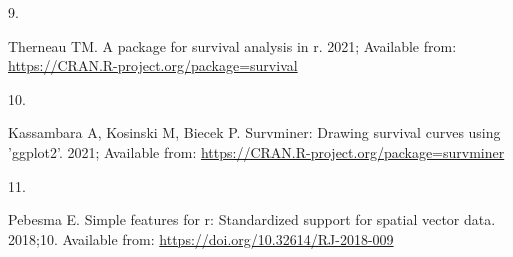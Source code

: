 \documentclass[
]{article}
\newlength{\cslhangindent}
\newlength{\csllabelwidth}
\newlength{\cslentryspacingunit} %
\newenvironment{CSLReferences}[2] %
 {%
  \setlength{\parindent}{0pt}
  \ifodd #1
  \let\oldpar\par
  \def\par{\hangindent=\cslhangindent\oldpar}
  \fi
  \setlength{\parskip}{#2\cslentryspacingunit}
 }%
 {}
\newcommand{\CSLLeftMargin}[1]{\parbox[t]{\csllabelwidth}{#1}}
\newcommand{\CSLRightInline}[1]{\parbox[t]{\linewidth - \csllabelwidth}{#1}\break}
\begin{document}
\begin{CSLReferences}{0}{0}
\leavevmode{}%
\CSLLeftMargin{9. }%
\CSLRightInline{Therneau TM. A package for survival analysis in r. 2021;
Available from: \url{https://CRAN.R-project.org/package=survival}}

\leavevmode{}%
\CSLLeftMargin{10. }%
\CSLRightInline{Kassambara A, Kosinski M, Biecek P. Survminer: Drawing
survival curves using 'ggplot2'. 2021; Available from:
\url{https://CRAN.R-project.org/package=survminer}}

\leavevmode{}%
\CSLLeftMargin{11. }%
\CSLRightInline{Pebesma E. {\textbraceleft}Simple features for r:
Standardized support for spatial vector data{\textbraceright}. 2018;10.
Available from: \url{https://doi.org/10.32614/RJ-2018-009}}

\end{CSLReferences}
\end{document}
